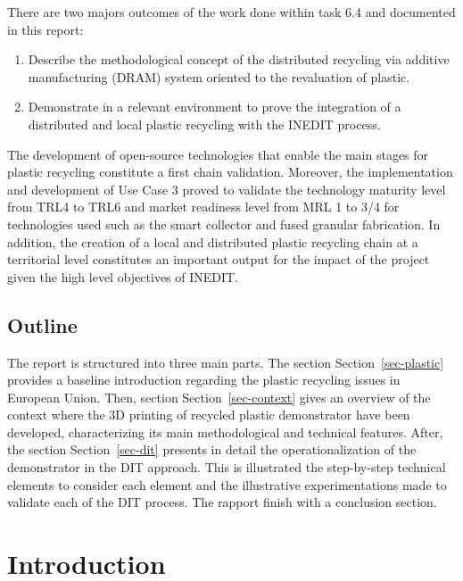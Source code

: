 \documentclass[
  11pt,
]{article}
\providecommand{\tightlist}{%
  \setlength{\itemsep}{0pt}\setlength{\parskip}{0pt}}\usepackage{longtable,booktabs,array}
\begin{document}
There are two majors outcomes of the work done within task 6.4 and
documented in this report:

\begin{enumerate}
\def\labelenumi{\arabic{enumi}.}
\tightlist
\item
  Describe the methodological concept of the distributed recycling via
  additive manufacturing (DRAM) system oriented to the revaluation of
  plastic.
\item
  Demonstrate in a relevant environment to prove the integration of a
  distributed and local plastic recycling with the INEDIT process.
\end{enumerate}

The development of open-source technologies that enable the main stages
for plastic recycling constitute a first chain validation. Moreover, the
implementation and development of Use Case 3 proved to validate the
technology maturity level from TRL4 to TRL6 and market readiness level
from MRL 1 to 3/4 for technologies used such as the smart collector and
fused granular fabrication. In addition, the creation of a local and
distributed plastic recycling chain at a territorial level constitutes
an important output for the impact of the project given the high level
objectives of INEDIT.

\hypertarget{outline}{%
\subsection{Outline}\label{outline}}

The report is structured into three main parts. The section
Section~\ref{sec-plastic} provides a baseline introduction regarding the
plastic recycling issues in European Union. Then, section
Section~\ref{sec-context} gives an overview of the context where the 3D
printing of recycled plastic demonstrator have been developed,
characterizing its main methodological and technical features. After,
the section Section~\ref{sec-dit} presents in detail the
operationalization of the demonstrator in the DIT approach. This is
illustrated the step-by-step technical elements to consider each element
and the illustrative experimentations made to validate each of the DIT
process. The rapport finish with a conclusion section.

\newpage

\hypertarget{introduction}{%
\section{Introduction}\label{introduction}}
\end{document}
